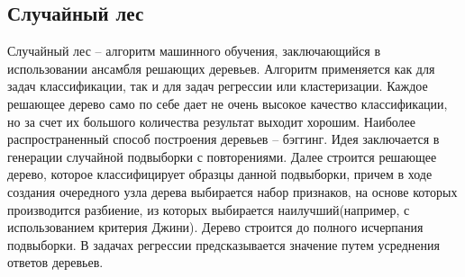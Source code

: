 \subsection{\centering Случайный лес}
Случайный лес -- алгоритм машинного обучения, заключающийся в использовании ансамбля решающих деревьев. Алгоритм применяется как для задач классификации, так и для задач регрессии или кластеризации. Каждое решающее дерево само по себе дает не очень высокое качество классификации, но за счет их большого количества результат выходит хорошим.
\newline
Наиболее распространенный способ построения деревьев -- бэггинг. Идея заключается в генерации случайной подвыборки с повторениями. Далее строится решающее дерево, которое классифицирует образцы данной подвыборки, причем в ходе создания очередного узла дерева выбирается набор признаков, на основе которых производится разбиение, из которых выбирается наилучший(например, с использованием критерия Джини). Дерево строится до полного исчерпания подвыборки.
\newline
В задачах регрессии предсказывается значение путем усреднения ответов деревьев.